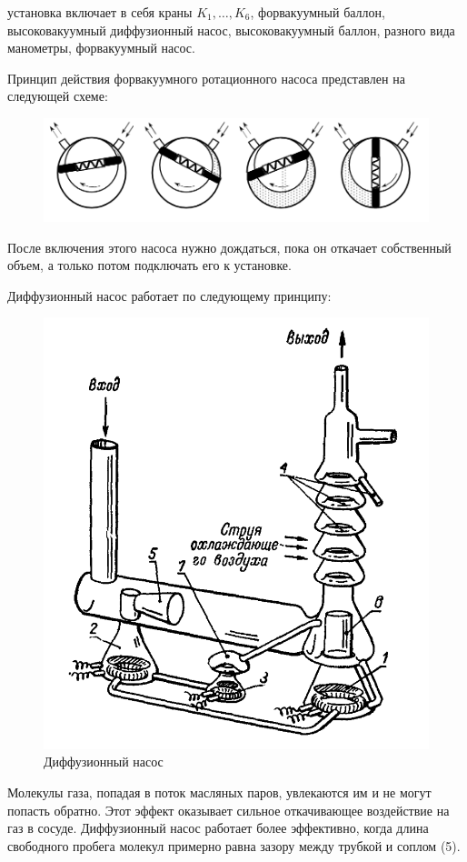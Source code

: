 \documentclass[12pt]{article}
\begin{document}
установка включает в себя краны $K_1, \dots, K_6$, форвакуумный баллон, высоковакуумный диффузионный насос, высоковакуумный баллон, разного вида манометры, форвакуумный насос.

Принцип действия форвакуумного ротационного насоса представлен на следующей схеме:

\begin{figure}[H]
	\centering
	\includegraphics[scale = 0.5]{./images/RotScheme.png}
	\caption{}
\end{figure}
После включения этого насоса нужно дождаться, пока он откачает собственный объем, а только потом подключать его к установке.

Диффузионный насос работает по следующему принципу:

\begin{figure}[H]
	\centering
	\includegraphics[scale = 0.5]{./images/Difus.png}
	\caption{Диффузионный насос}
\end{figure}
Молекулы газа, попадая в поток масляных паров, увлекаются им и не могут попасть обратно. Этот эффект оказывает сильное откачивающее воздействие на газ в сосуде. Диффузионный насос работает более эффективно, когда длина свободного пробега молекул примерно равна зазору между трубкой и соплом (5).
\end{document}
